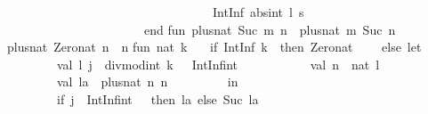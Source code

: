 \begin{isabellebody}
\begin{isamarkuptext}
\ \ \ \ \ \ \ \ \ \ \ \ \ \ \ \ \ \ \ \ \ \ \ \ \ \ \ \ \ \ \ \ \ \ \ \ IntInf{}{}\ {}abs{}int\ l{}\ s{}{}{}\isanewline
\ \ \ \ \ \ \ \ \ \ \ \ \ \ \ \ \ \ \ \ \ \ \ \ \ end{}{}{}{}\isanewline
\isanewline
fun\ plus{}nat\ {}Suc\ m{}\ n\ {}\ plus{}nat\ m\ {}Suc\ n{}\isanewline
\ \ {}\ plus{}nat\ Zero{}nat\ n\ {}\ n{}\isanewline
\isanewline
fun\ nat\ k\ {}\isanewline
\ \ {}if\ IntInf{}{}{}\ {}k{}\ {}{}\ then\ Zero{}nat\isanewline
\ \ \ \ else\ let\isanewline
\ \ \ \ \ \ \ \ \ \ \ val\ {}l{}\ j{}\ {}\ divmod{}int\ k\ {}{}\ {}\ IntInf{}int{}{}\isanewline
\ \ \ \ \ \ \ \ \ \ \ val\ n\ {}\ nat\ l{}\isanewline
\ \ \ \ \ \ \ \ \ \ \ val\ la\ {}\ plus{}nat\ n\ n{}\isanewline
\ \ \ \ \ \ \ \ \ in\isanewline
\ \ \ \ \ \ \ \ \ \ \ {}if\ {}{}j\ {}\ IntInf{}int{}\ {}\ {}{}\ then\ la\ else\ Suc\ la{}\isanewline

\end{isamarkuptext}
\end{isabellebody}
